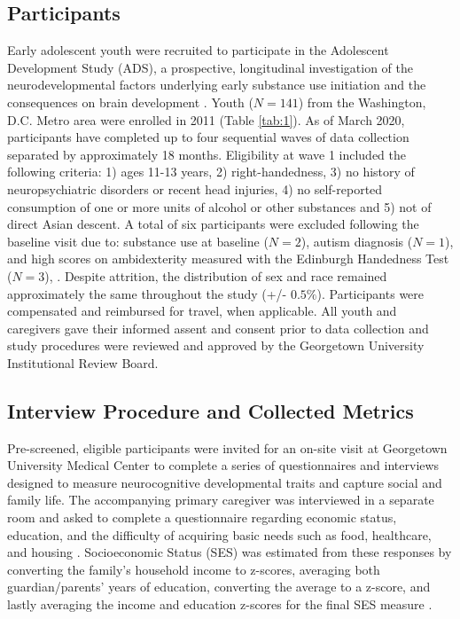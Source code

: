 \documentclass{article}%
\begin{document}
\subsection*{Participants} 
Early adolescent youth were recruited to participate in the Adolescent Development Study (ADS), a prospective, longitudinal investigation of the neurodevelopmental factors underlying early substance use initiation and the consequences on brain development \citep{Fishbein2016}. Youth ($N=141$) from the Washington, D.C. Metro area were enrolled in 2011 (Table \ref{tab:1}). As of March 2020, participants have completed up to four sequential waves of data collection separated by approximately 18 months. Eligibility at wave 1 included the following criteria: 1) ages 11-13 years, 2) right-handedness, 3) no history of neuropsychiatric disorders or recent head injuries, 4) no self-reported consumption of one or more units of alcohol or other substances and 5) not of direct Asian descent. A total of six participants were excluded following the baseline visit due to: substance use at baseline ($N=2$), autism diagnosis ($N=1$), and high scores on ambidexterity measured with the Edinburgh Handedness Test ($N=3$), \citep{veale2014edinburgh}. Despite attrition, the distribution of sex and race remained approximately the same throughout the study (+/- $0.5\%$). Participants were compensated and reimbursed for travel, when applicable. All youth and caregivers gave their informed assent and consent prior to data collection and study procedures were reviewed and approved by the Georgetown University Institutional Review Board. 
\subsection*{Interview Procedure and Collected Metrics} Pre-screened, eligible participants were invited for an on-site visit at Georgetown University Medical Center to complete a series of questionnaires and interviews designed to measure neurocognitive developmental traits and capture social and family life. The accompanying primary caregiver was interviewed in a separate room and asked to complete a questionnaire regarding economic status, education, and the difficulty of acquiring basic needs such as food, healthcare, and housing \citep{bornstein2003socioeconomic}. Socioeconomic Status (SES) was estimated from these responses by converting the family’s household income to z-scores, averaging both guardian/parents' years of education, converting the average to a z-score, and lastly averaging the income and education z-scores for the final SES measure \citep{manuck2010ses}.
\end{document}
